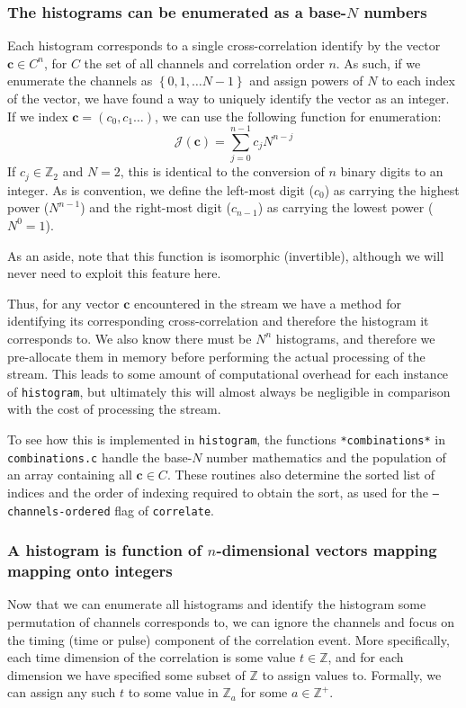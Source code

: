 \documentclass{article}
\newcommand{\braces}[1]{\ensuremath{\left\lbrace #1 \right\rbrace}}
\newcommand{\correlate}{\texttt{correlate}}
\newcommand{\histogram}{\texttt{histogram}}
\newcommand{\integers}{\ensuremath{\mathbb{Z}}}
\renewcommand{\vec}{\mathbf}
\newcommand{\channel}{\ensuremath{c}}
\newcommand{\channels}{\ensuremath{C}}
\newcommand{\Index}{\ensuremath{\mathcal{J}}}
\begin{document}
\subsubsection{The histograms can be enumerated as a base-$N$ numbers}
Each histogram corresponds to a single cross-correlation identify by the vector $\vec{\channel}\in\channels^{n}$, for $\channels$ the set of all channels and correlation order $n$. As such, if we enumerate the channels as $\braces{0,1,\ldots N-1}$ and assign powers of $N$ to each index of the vector, we have found a way to uniquely identify the vector as an integer. If we index $\vec{\channel}=(\channel_{0},\channel_{1}\ldots)$, we can use the following function for enumeration:
\begin{equation}
\Index(\vec{c}) = \sum_{j=0}^{n-1}{c_{j}N^{n-j}}
\end{equation}
If $c_{j}\in\integers_{2}$ and $N=2$, this is identical to the conversion of $n$ binary digits to an integer. As is convention, we define the left-most digit ($\channel_{0}$) as carrying the highest power ($N^{n-1}$) and the right-most digit ($\channel_{n-1}$) as carrying the lowest power ($N^{0}=1$).

As an aside, note that this function is isomorphic (invertible), although we will never need to exploit this feature here. 

Thus, for any vector $\vec{c}$ encountered in the stream we have a method for identifying its corresponding cross-correlation and therefore the histogram it corresponds to. We also know there must be $N^{n}$ histograms, and therefore we pre-allocate them in memory before performing the actual processing of the stream. This leads to some amount of computational overhead for each instance of \histogram, but ultimately this will almost always be negligible in comparison with the cost of processing the stream. 

To see how this is implemented in \histogram, the functions \texttt{*combinations*} in \texttt{combinations.c} handle the base-$N$ number mathematics and the population of an array containing all $\vec{\channel}\in\channels$. These routines also determine the sorted list of indices and the order of indexing required to obtain the sort, as used for the \texttt{--channels-ordered} flag of \correlate. 

\subsubsection{A histogram is function of $n$-dimensional vectors mapping mapping onto integers}
Now that we can enumerate all histograms and identify the histogram some permutation of channels corresponds to, we can ignore the channels and focus on the timing (time or pulse) component of the correlation event. More specifically, each time dimension of the correlation is some value $t\in\integers$, and for each dimension we have specified some subset of $\integers$ to assign values to. Formally, we can assign any such $t$ to some value in $\integers_{a}$ for some $a\in\integers^{+}$. 
\end{document}
